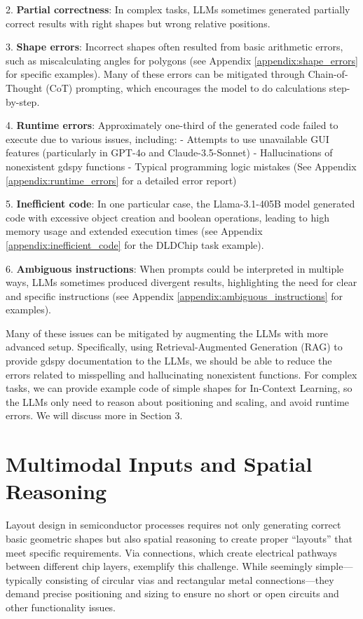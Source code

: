 \documentclass{article}
\begin{document}
2. \textbf{Partial correctness}: In complex tasks, LLMs sometimes generated partially correct results with right shapes but wrong relative positions.

3. \textbf{Shape errors}: Incorrect shapes often resulted from basic arithmetic errors, such as miscalculating angles for polygons (see Appendix \ref{appendix:shape_errors} for specific examples). Many of these errors can be mitigated 
through Chain-of-Thought (CoT) prompting, which 
encourages the model to do calculations step-by-step.

4. \textbf{Runtime errors}: Approximately one-third of the generated code failed to execute due to various issues, including:
   - Attempts to use unavailable GUI features (particularly in GPT-4o and Claude-3.5-Sonnet)
   - Hallucinations of nonexistent gdspy functions
   - Typical programming logic mistakes
   (See Appendix \ref{appendix:runtime_errors} for a detailed error report)

5. \textbf{Inefficient code}: In one particular case, the Llama-3.1-405B model generated code with excessive object creation and boolean operations, leading to high memory usage and extended execution times (see Appendix \ref{appendix:inefficient_code} for the DLDChip task example).

6. \textbf{Ambiguous instructions}: When prompts could be interpreted in multiple ways, LLMs sometimes produced divergent results, highlighting the need for clear and specific instructions (see Appendix \ref{appendix:ambiguous_instructions} for examples).

Many of these issues can be mitigated by augmenting the LLMs with more advanced setup. Specifically, using Retrieval-Augmented Generation (RAG) to provide gdspy documentation to the LLMs, we should be able to reduce the errors related to misspelling and hallucinating nonexistent functions. For complex tasks, we can provide example code of simple shapes for In-Context Learning, so the LLMs only need to reason about positioning and scaling, and avoid runtime errors. We will discuss more in Section 3.

\section{Multimodal Inputs and Spatial Reasoning}
Layout design in semiconductor processes requires not only generating correct basic geometric shapes but also spatial reasoning to create proper ``layouts'' that meet specific requirements. Via connections, which create electrical pathways between different chip layers, exemplify this challenge. While seemingly simple—typically consisting of circular vias and rectangular metal connections—they demand precise positioning and sizing to ensure no short or open circuits and other functionality issues.
\end{document}
